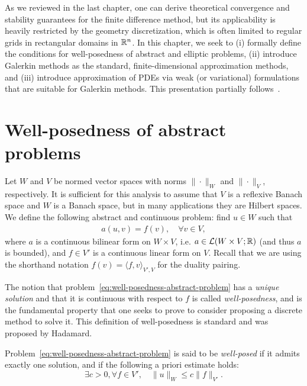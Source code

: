 As we reviewed in the last chapter, one can derive theoretical convergence and stability guarantees for the finite difference method, but its applicability is heavily restricted by the geometry discretization, which is often limited to regular grids in rectangular domains in $\mathbb{R}^n$. In this chapter, we seek to (i) formally define the conditions for well-posedness of abstract and elliptic problems, (ii) introduce Galerkin methods as the standard, finite-dimensional approximation methods, and (iii) introduce approximation of PDEs via weak (or variational) formulations that are suitable for Galerkin methods. This presentation partially follows~\cite{ern2004theory}.

\section{Well-posedness of abstract problems}
Let $W$ and $V$ be normed vector spaces with norms $\|\cdot\|_W$ and $\|\cdot\|_V$, respectively. It is sufficient for this analysis to assume that $V$ is a reflexive Banach space and $W$ is a Banach space, but in many applications they are Hilbert spaces. We define the following abstract and continuous problem: find $u\in W$ such that
\begin{equation}\label{eq:well-posedness-abstract-problem}
    \begin{aligned}
        a(u,v) = f(v),\quad \forall v\in V,
    \end{aligned}
\end{equation}
where $a$ is a continuous bilinear form on $W\times V$, i.e. $a\in \mathcal{L}(W\times V; \mathbb{R})$ (and thus $a$ is bounded), and $f\in V'$ is a continuous linear form on $V$. Recall that we are using the shorthand notation $f(v)=\langle f, v\rangle_{V',V}$ for the duality pairing. 

The notion that problem~\ref{eq:well-posedness-abstract-problem} has a \emph{unique solution} and that it is continuous with respect to $f$ is called \emph{well-posedness}, and is the fundamental property that one seeks to prove to consider proposing a discrete method to solve it. This definition of well-posedness is standard and was proposed by Hadamard. 
\begin{definition}
    Problem~\ref{eq:well-posedness-abstract-problem} is said to be \emph{well-posed} if it admits exactly one solution, and if the following a priori estimate holds: 
    \begin{equation}
        \exists c>0, \forall f\in V',\quad \|u\|_W \leq c\|f\|_{V'}.
    \end{equation}
\end{definition}

